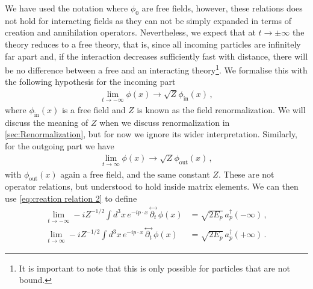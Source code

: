 We have used the notation where $\phi_{0}$ are free fields, however, these relations does not hold for interacting fields as they can not be simply expanded in terms of creation and annihilation operators. Nevertheless, we expect that at $t\rightarrow\pm \infty$ the theory reduces to a free theory, that is, since all incoming particles are infinitely far apart and, if the interaction decreases sufficiently fast with distance, there will be no difference between a free and an interacting theory\footnote{It is important to note that this is only possible for particles that are not bound.}. We formalise this with the following hypothesis for the incoming part
\begin{align}
    \lim_{t\to-\infty}\phi(x)\rightarrow \sqrt{Z}\phi_{\text{in}}(x)\,,
\end{align}
where $\phi_{\text{in}}(x)$ is a free field and $Z$ is known as the field renormalization. We will discuss the meaning of $Z$ when we discuss renormalization in \cref{sec:Renormalization}, but for now we ignore its wider interpretation. Similarly, for the outgoing part we have
\begin{align}
    \lim_{t\to\infty}\phi(x)\rightarrow \sqrt{Z}\phi_{\text{out}}(x)\,,
\end{align}
with $\phi_{\text{out}}(x)$ again a free field, and the same constant $Z$. These are not operator relations, but understood to hold inside matrix elements. We can then use \cref{eq:creation relation 2} to define 
\begin{align}
    \lim_{t\to -\infty}-iZ^{-1/2}\int d^{3}x\,e^{-ip\cdot x}\,\overset{\leftrightarrow}{\partial_{t}}\,\phi(x)&=\sqrt{2E_{p}}\,a_{p}^{\dagger}(-\infty)\,,
    \\
    \lim_{t\to \infty}-iZ^{-1/2}\int d^{3}x\,e^{-ip\cdot x}\,\overset{\leftrightarrow}{\partial_{t}}\,\phi(x)&=\sqrt{2E_{p}}\,a_{p}^{\dagger}(+\infty)\,.
\end{align}


